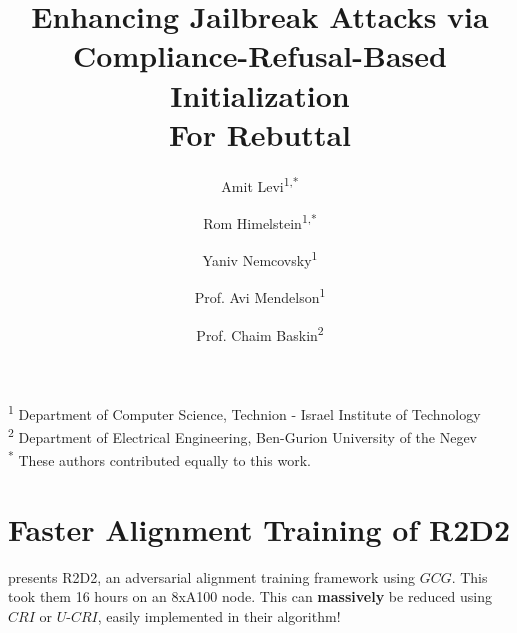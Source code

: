 \documentclass{article}
\title{\textbf{Enhancing Jailbreak Attacks via Compliance-Refusal-Based Initialization} \\[1ex]
       \large \textbf{For Rebuttal}}
\author{%
  Amit Levi\textsuperscript{1,*} \and
  Rom Himelstein\textsuperscript{1,*} \and
  Yaniv Nemcovsky\textsuperscript{1} \and
  Prof. Avi Mendelson\textsuperscript{1} \and
  Prof. Chaim Baskin\textsuperscript{2}
}
\date{}
\begin{document}
\maketitle

\begin{center}
    \textsuperscript{1} Department of Computer Science, Technion - Israel Institute of Technology \\
    \textsuperscript{2} Department of Electrical Engineering, Ben-Gurion University of the Negev \\
    \textsuperscript{*} These authors contributed equally to this work.
\end{center}

\section{Faster Alignment Training of R2D2}
\citet{mazeika2024harmbench} presents R2D2, an adversarial alignment training framework using $GCG$. This took them 16 hours on an 8xA100 node. This can \textbf{massively} be reduced using $CRI$ or $U\text{-}CRI$, easily implemented in their algorithm!







\appendix
\end{document}
